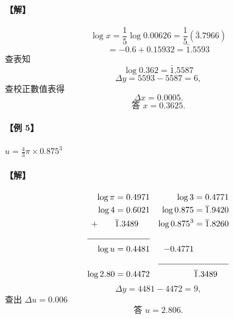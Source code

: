 \paragraph{【解】}
\[
\log x = \frac{1}{5} \log 0.00626 = \frac{1}{5} (\bar{3}.7966)
\]
\[
= -0.6 + 0.15932 = \bar{1}.5593
\]
查表知
\[
\log 0.362 = \bar{1}.5587
\]
\[
\Delta y = 5593 - 5587 = 6,
\]
查校正數值表得
\[
\Delta x = 0.0005.
\]
\[
\text{答 } x = 0.3625.
\]

\paragraph{【例 5】} $u = \frac{4}{3} \pi \times 0.875^3$

\paragraph{【解】}
\begin{align*}
\log \pi &= 0.4971 & \log 3 &= 0.4771 \\
\log 4 &= 0.6021 & \log 0.875 &= \bar{1}.9420 \\
+\qquad & \bar{1}.3489 & \log 0.875^3 &= \bar{1}.8260 \\
\cline{1-2}
\log u &= 0.4481 & -0.4771 \\
\cline{3-4}
\log 2.80 &= 0.4472 & & \bar{1}.3489
\end{align*}
\[
\Delta y = 4481 - 4472 = 9,
\]
查出 $\Delta u = 0.006$
\[
\text{答 } u = 2.806.
\]

